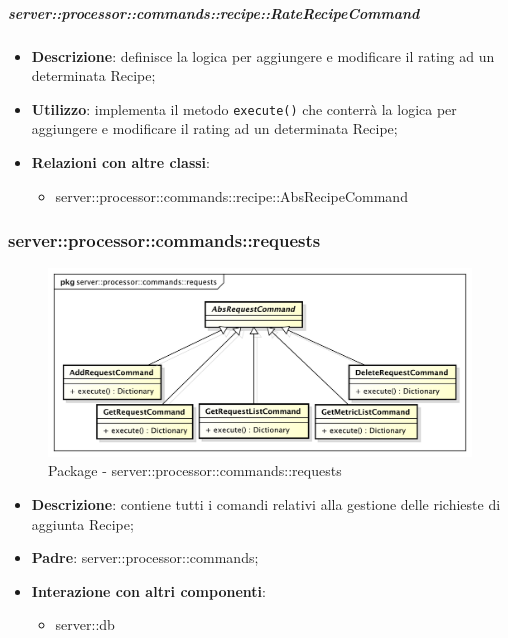         \subparagraph{server::processor::commands::recipe::RateRecipeCommand} %
        \label{subp:bdsm_app_server_processor_commands_recipe_raterecipecommand}
        \begin{itemize}
          \item \textbf{Descrizione}: definisce la logica per aggiungere e modificare il rating ad un determinata Recipe;
          \item \textbf{Utilizzo}: implementa il metodo \texttt{execute()} che conterrà la logica per aggiungere e modificare il rating ad un determinata Recipe;
          \item \textbf{Relazioni con altre classi}:
            \begin{itemize}
              \item server::processor::commands::recipe::AbsRecipeCommand
            \end{itemize}
        \end{itemize}


      \subsubsection{server::processor::commands::requests} %
      \label{ssub:bdsm_app_server_processor_commands_requests}
      \begin{figure}[!htbp]
      	\centering
      	\centerline{\includegraphics[scale=0.5]{./images/server/requests.pdf}}
      	\caption{Package - server::processor::commands::requests}
      \end{figure}

      \begin{itemize}
        \item \textbf{Descrizione}: contiene tutti i comandi relativi alla gestione delle richieste di aggiunta Recipe;
        \item \textbf{Padre}: server::processor::commands;
        \item \textbf{Interazione con altri componenti}:
          \begin{itemize}
            \item server::db
          \end{itemize}
      \end{itemize}

